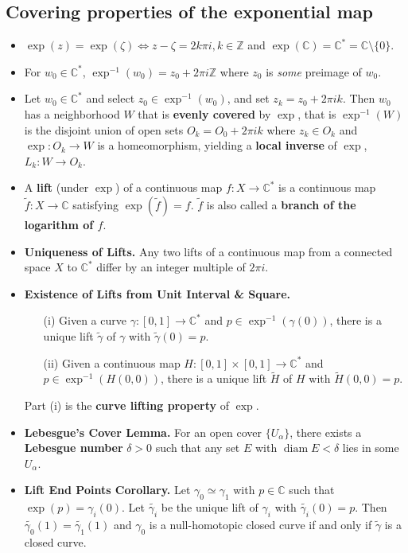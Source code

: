 \documentclass{article}
\DeclareMathOperator{\diam}{diam}
\newenvironment{topic}[1]{%
{\subsection{#1}}%
\begin{itemize}%
}{%
\end{itemize}%
}
\newcommand{\theorem}[1]{\item {\bf #1.}}
\newcommand{\corollary}[1]{\item {\bf #1.}}
\newcommand{\lemma}[1]{\item {\bf #1.}}
\newcommand{\term}[1]{{\bf #1}}
\newcommand{\remark}{\item}
\begin{document}
\begin{topic}{Covering properties of the exponential map}

\remark $\exp(z) = \exp(\zeta) \iff z - \zeta = 2 k \pi i, k \in \mathbb{Z}$ and $\exp(\mathbb{C}) = \mathbb{C}^\ast = \mathbb{C} \setminus \{ 0 \}$.

\remark For $w_0 \in \mathbb{C}^\ast$, $\exp^{-1}(w_0) = z_0 + 2 \pi i \mathbb{Z}$ where $z_0$ is {\em some} preimage of $w_0$.

\remark Let $w_0 \in \mathbb{C}^\ast$ and select $z_0 \in \exp^{-1}(w_0)$, and set $z_k = z_0 + 2 \pi i k$. Then $w_0$ has a neighborhood $W$ that is \term{evenly covered} by $\exp$, that is $\exp^{-1}(W)$ is the disjoint union of open sets $O_k = O_0 + 2 \pi i k$ where $z_k \in O_k$ and $\exp : O_k \to W$ is a homeomorphism, yielding a \term{local inverse} of $\exp$, $L_k : W \to O_k$.

\remark A \term{lift} (under $\exp$) of a continuous map $f : X \to \mathbb{C}^\ast$ is a continuous map $\tilde{f} : X \to \mathbb{C}$ satisfying $\exp(\tilde{f}) = f$. $\tilde{f}$ is also called a \term{branch of the logarithm of $f$}.

\theorem{Uniqueness of Lifts} Any two lifts of a continuous map from a connected space $X$ to $\mathbb{C}^\ast$ differ by an integer multiple of $2 \pi i$.

\theorem{Existence of Lifts from Unit Interval \& Square}
\begin{enumerate}
\item[(i)] Given a curve $\gamma : [0, 1] \to \mathbb{C}^\ast$ and $p \in \exp^{-1}(\gamma(0))$, there is a unique lift $\tilde{\gamma}$ of $\gamma$ with $\tilde{\gamma}(0) = p$.
\item[(ii)] Given a continuous map $H : [0, 1] \times [0, 1] \to \mathbb{C}^\ast$ and $p \in \exp^{-1}(H(0, 0))$, there is a unique lift $\tilde{H}$ of $H$ with $\tilde{H}(0, 0) = p$.
\end{enumerate}
Part (i) is the \term{curve lifting property} of $\exp$.

\lemma{Lebesgue's Cover Lemma} For an open cover $\{U_\alpha\}$, there exists a \term{Lebesgue number} $\delta > 0$ such that any set $E$ with $\diam E < \delta$ lies in some $U_\alpha$.

\corollary{Lift End Points Corollary} Let $\gamma_0 \simeq \gamma_1$ with $p \in \mathbb{C}$ such that $\exp(p) = \gamma_i(0)$. Let $\tilde{\gamma_i}$ be the unique lift of $\gamma_i$ with $\tilde{\gamma_i}(0) = p$. Then $\tilde{\gamma_0}(1) = \tilde{\gamma_1}(1)$ and $\gamma_0$ is a null-homotopic closed curve if and only if $\tilde{\gamma}$ is a closed curve.


\end{topic}
\end{document}
